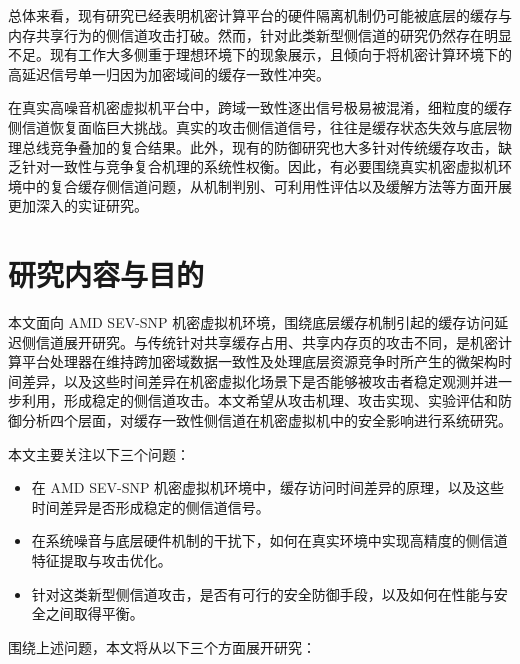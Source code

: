 总体来看，现有研究已经表明机密计算平台的硬件隔离机制仍可能被底层的缓存与内存共享行为的侧信道攻击打破。然而，针对此类新型侧信道的研究仍然存在明显不足。现有工作大多侧重于理想环境下的现象展示，且倾向于将机密计算环境下的高延迟信号单一归因为加密域间的缓存一致性冲突。

在真实高噪音机密虚拟机平台中，跨域一致性逐出信号极易被混淆，细粒度的缓存侧信道恢复面临巨大挑战。真实的攻击侧信道信号，往往是缓存状态失效与底层物理总线竞争叠加的复合结果。此外，现有的防御研究也大多针对传统缓存攻击，缺乏针对一致性与竞争复合机理的系统性权衡。因此，有必要围绕真实机密虚拟机环境中的复合缓存侧信道问题，从机制判别、可利用性评估以及缓解方法等方面开展更加深入的实证研究。

\section{研究内容与目的}
本文面向 AMD SEV-SNP 机密虚拟机环境，围绕底层缓存机制引起的缓存访问延迟侧信道展开研究。与传统针对共享缓存占用、共享内存页的攻击不同，是机密计算平台处理器在维持跨加密域数据一致性及处理底层资源竞争时所产生的微架构时间差异，以及这些时间差异在机密虚拟化场景下是否能够被攻击者稳定观测并进一步利用，形成稳定的侧信道攻击。本文希望从攻击机理、攻击实现、实验评估和防御分析四个层面，对缓存一致性侧信道在机密虚拟机中的安全影响进行系统研究。

\noindent 本文主要关注以下三个问题：
\begin{itemize}
  \item 在 AMD SEV-SNP 机密虚拟机环境中，缓存访问时间差异的原理，以及这些时间差异是否形成稳定的侧信道信号。
  \item 在系统噪音与底层硬件机制的干扰下，如何在真实环境中实现高精度的侧信道特征提取与攻击优化。
  \item 针对这类新型侧信道攻击，是否有可行的安全防御手段，以及如何在性能与安全之间取得平衡。
\end{itemize}

\noindent 围绕上述问题，本文将从以下三个方面展开研究：

